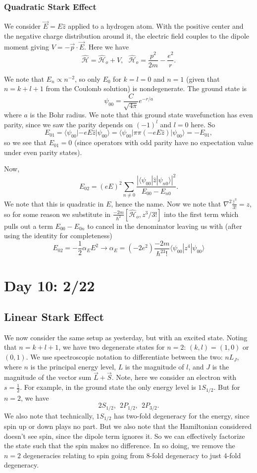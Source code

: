 \documentclass[fontsize=12pt]{scrartcl}
\newcommand{\la}{\langle}
\newcommand{\ra}{\rangle}
\newcommand{\Ham}{\hat{\mathcal{H}}}
\begin{document}
\subsubsection{Quadratic Stark Effect}

We consider $\vec{E}=E\hat{z}$ applied to a hydrogen atom. With the positive center and the negative charge distribution around it, the electric field couples to the dipole moment giving $V=-\vec{p}\cdot\vec{E}$. Here we have $$\Ham=\Ham_o+V, \ \ \ \Ham_o=\frac{p^2}{2m}-\frac{e^2}{r}.$$

We note that $E_n\propto n^{-2}$, so only $E_0$ for $k=l=0$ and $n=1$ (given that $n=k+l+1$ from the Coulomb solution) is nondegenerate. The ground state is $$\psi_{00}=\frac{C}{\sqrt{4\pi}}e^{-r/a}$$ where $a$ is the Bohr radius. We note that this ground state wavefunction has even parity, since we saw the parity depends on $(-1)^l$ and $l=0$ here. So $$E_{01}=\la\psi_{00}|-eE\hat{z}|\psi_{00}\ra=\la \psi_{00}| \pi \pi(-eE\hat{z})|\psi_{00}\ra = -E_{01},$$ so we see that $E_{01}=0$ (since operators with odd parity have no expectation value under even parity states).

Now, $$E_{02}=(eE)^2\sum_{n\neq 0} \frac{|\la\psi_{00}|\hat{z}|\psi_{n0}\ra|^2}{E_{00}-E_{n0}}.$$ We note that this is quadratic in $E$, hence the name. Now we note that $\nabla^2\frac{\hat{z}^3}{3!}=z$, so for some reason we substitute in $\frac{-2m}{\hbar^2}[\Ham_o,z^3/3!]$ into the first term which pulls out a term $E_{00}-E_{0n}$ to cancel in the denominator leaving us with (after using the identity for completeness) $$E_{02}=-\frac{1}{2}\alpha_E E^2\to \alpha_E=(-2e^2)\frac{-2m}{\hbar^23!}\la\psi_{00}|z^4|\psi_{00}\ra$$

\section{Day 10: 2/22}
\subsection{Linear Stark Effect}

We now consider the same setup as yesterday, but with an excited state. Noting that $n=k+l+1$, we have two degenerate states for $n=2$: $(k,l)=(1,0)$ or $(0,1)$. We use spectroscopic notation to differentiate between the two: $nL_J$, where $n$ is the principal energy level, $L$ is the magnitude of $l$, and $J$ is the magnitude of the vector sum $\vec{L}+\vec{S}$. Note, here we consider an electron with $s=\frac{1}{2}$. For example, in the ground state the only energy level is $1S_{1/2}$. But for $n=2$, we have $$2S_{1/2}, \ \ 2P_{1/2}, \ \ 2P_{3/2}.$$ We also note that technically, $1S_{1/2}$ has two-fold degeneracy for the energy, since spin up or down plays no part. But we also note that the Hamiltonian considered doesn't see spin, since the dipole term ignores it. So we can effectively factorize the state such that the spin makes no difference. In so doing, we remove the $n=2$ degeneracies relating to spin going from 8-fold degeneracy to just 4-fold degeneracy.
\end{document}
